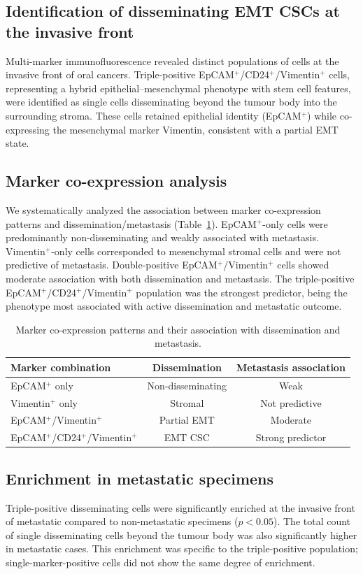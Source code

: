 \documentclass[11pt]{article}
\begin{document}
\subsection{Identification of disseminating EMT CSCs at the invasive front}
Multi-marker immunofluorescence revealed distinct populations of cells at the invasive front of oral cancers. Triple-positive EpCAM$^+$/CD24$^+$/Vimentin$^+$ cells, representing a hybrid epithelial--mesenchymal phenotype with stem cell features, were identified as single cells disseminating beyond the tumour body into the surrounding stroma. These cells retained epithelial identity (EpCAM$^+$) while co-expressing the mesenchymal marker Vimentin, consistent with a partial EMT state.

\subsection{Marker co-expression analysis}
We systematically analyzed the association between marker co-expression patterns and dissemination/metastasis (Table~\ref{tab:markers}). EpCAM$^+$-only cells were predominantly non-disseminating and weakly associated with metastasis. Vimentin$^+$-only cells corresponded to mesenchymal stromal cells and were not predictive of metastasis. Double-positive EpCAM$^+$/Vimentin$^+$ cells showed moderate association with both dissemination and metastasis. The triple-positive EpCAM$^+$/CD24$^+$/Vimentin$^+$ population was the strongest predictor, being the phenotype most associated with active dissemination and metastatic outcome.

\begin{table}[h]
\centering
\caption{Marker co-expression patterns and their association with dissemination and metastasis.}
\label{tab:markers}
\begin{tabular}{lcc}
\toprule
Marker combination & Dissemination & Metastasis association \\
\midrule
EpCAM$^+$ only & Non-disseminating & Weak \\
Vimentin$^+$ only & Stromal & Not predictive \\
EpCAM$^+$/Vimentin$^+$ & Partial EMT & Moderate \\
EpCAM$^+$/CD24$^+$/Vimentin$^+$ & EMT CSC & Strong predictor \\
\bottomrule
\end{tabular}
\end{table}

\subsection{Enrichment in metastatic specimens}
Triple-positive disseminating cells were significantly enriched at the invasive front of metastatic compared to non-metastatic specimens ($p < 0.05$). The total count of single disseminating cells beyond the tumour body was also significantly higher in metastatic cases. This enrichment was specific to the triple-positive population; single-marker-positive cells did not show the same degree of enrichment.
\end{document}
